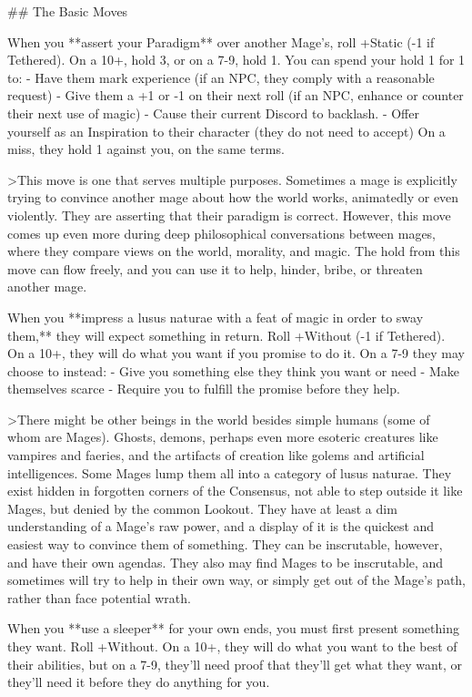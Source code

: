 \documentclass[
  oneside,
  statementpaper,
  9pt]{memoir}
\begin{document}
\begin{Player}

## The Basic Moves

When you **assert your Paradigm** over another Mage’s, roll +Static (-1 if Tethered). On a 10+, hold 3, or on a 7-9, hold 1. You can spend your hold 1 for 1 to:
- Have them mark experience (if an NPC, they comply with a reasonable request)
- Give them a +1 or -1 on their next roll (if an NPC, enhance or counter their next use of magic)
- Cause their current Discord to backlash. 
- Offer yourself as an Inspiration to their character (they do not need to accept)
On a miss, they hold 1 against you, on the same terms.

>This move is one that serves multiple purposes. Sometimes a mage is explicitly trying to convince another mage about how the world works, animatedly or even violently. They are asserting that their paradigm is correct. However, this move comes up even more during deep philosophical conversations between mages, where they compare views on the world, morality, and magic. The hold from this move can flow freely, and you can use it to help, hinder, bribe, or threaten another mage.

When you **impress a lusus naturae with a feat of magic in order to sway them,** they will expect something in return. Roll +Without (-1 if Tethered). On a 10+, they will do what you want if you promise to do it. On a 7-9 they may choose to instead:
- Give you something else they think you want or need
- Make themselves scarce
- Require you to fulfill the promise before they help.

>There might be other beings in the world besides simple humans (some of whom are Mages). Ghosts, demons, perhaps even more esoteric creatures like vampires and faeries, and the artifacts of creation like golems and artificial intelligences. Some Mages lump them all into a category of lusus naturae. They exist hidden in forgotten corners of the Consensus, not able to step outside it like Mages, but denied by the common Lookout. They have at least a dim understanding of a Mage’s raw power, and a display of it is the quickest and easiest way to convince them of something. They can be inscrutable, however, and have their own agendas. They also may find Mages to be inscrutable, and sometimes will try to help in their own way, or simply get out of the Mage’s path, rather than face potential wrath.

When you **use a sleeper** for your own ends, you must first present something they want. Roll +Without. On a 10+, they will do what you want to the best of their abilities, but on a 7-9, they’ll need proof that they’ll get what they want, or they’ll need it before they do anything for you.


\end{Player}
\end{document}
